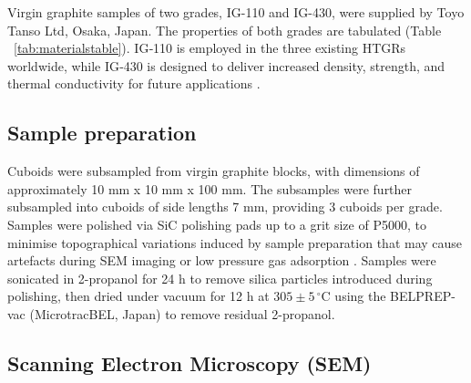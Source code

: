 \documentclass[review]{elsarticle}
\begin{document}
Virgin graphite samples of two grades, IG-110 and IG-430, were supplied by Toyo
Tanso Ltd\texttrademark{}, Osaka, Japan. The properties of both grades are
tabulated (Table ~\ref{tab:materialstable}). IG‑110 is employed in the
three existing HTGRs worldwide, while IG‑430 is designed to deliver increased
density, strength, and thermal conductivity for future
applications \citep{toyotanso_atomic_nuclear}.

\begin{table}[b]
  \centering
  \caption{Formation characteristics and properties of IG-110 and IG-430 nuclear grade graphites \citep{Jones2018, ARREGUIMENA2022112047}}
  \label{tab:materialstable}
\end{table}

\subsection{Sample preparation}
Cuboids were subsampled from virgin graphite blocks, with dimensions of
approximately 10 mm x 10 mm x 100 mm. The subsamples were further subsampled
into cuboids of side lengths 7 mm, providing 3 cuboids per grade. Samples were
polished via SiC polishing pads up to a grit size of P5000, to minimise
topographical variations induced by sample preparation that may cause artefacts
during SEM imaging or low pressure gas adsorption \citep{Fang2022,Jones2018}.
Samples were sonicated in 2-propanol for 24 h to remove silica particles
introduced during polishing, then dried under vacuum for 12 h at $305 \pm 5
\,^\circ\mathrm{C}$ using the BELPREP-vac (MicrotracBEL, Japan) to remove residual
2-propanol.

\subsection{Scanning Electron Microscopy (SEM)}
\end{document}

